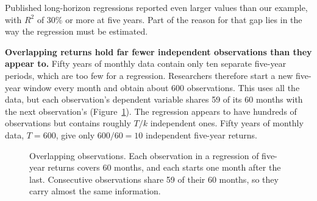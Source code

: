 Published long-horizon regressions reported even larger values than our example, with $R^2$ of 30\% or more at five years. Part of the reason for that gap lies in the way the regression must be estimated.

\textbf{Overlapping returns hold far fewer independent observations than they appear to.} Fifty years of monthly data contain only ten separate five-year periods, which are too few for a regression. Researchers therefore start a new five-year window every month and obtain about 600 observations. This uses all the data, but each observation's dependent variable shares 59 of its 60 months with the next observation's (Figure~\ref{fig:03-overlap}). The regression appears to have hundreds of observations but contains roughly $T/k$ independent ones. Fifty years of monthly data, $T = 600$, give only $600/60 = 10$ independent five-year returns.




\begin{figure}[!htbp]
  \centering
\caption{Overlapping observations. Each observation in a regression of five-year returns covers 60 months, and each starts one month after the last. Consecutive observations share 59 of their 60 months, so they carry almost the same information.}
\label{fig:03-overlap}
\end{figure}



